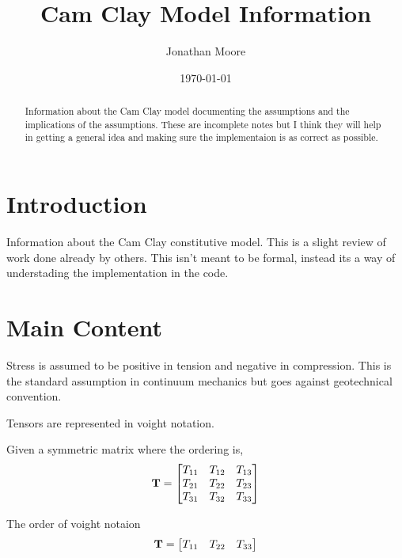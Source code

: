 \documentclass[a4paper,12pt]{article}
\title{Cam Clay Model Information}
\author{Jonathan Moore}
\date{\today}
\begin{document}
\maketitle

\begin{abstract}
    Information about the Cam Clay model documenting the assumptions and the implications of the assumptions. These are incomplete notes but I think they will help in getting a general idea and making sure the implementaion is as correct as possible.
\end{abstract}

\section{Introduction}
Information about the Cam Clay constitutive model. This is a slight review of work done already by others. This isn't meant to be formal, instead its a way of understading the implementation in the code.

\section{Main Content}


Stress is assumed to be positive in tension and negative in compression. This is the standard assumption in continuum mechanics but goes against geotechnical convention.

Tensors are represented in voight notation.


Given a symmetric matrix where the ordering is,
\begin{equation}
    \bf{T} =
    \begin{bmatrix}
        T_{11} & T_{12} & T_{13} \\
        T_{21} & T_{22} & T_{23} \\
        T_{31} & T_{32} & T_{33} \\
    \end{bmatrix}
\end{equation}

The order of voight notaion 
\begin{equation}
    \bf{T} = 
    \begin{bmatrix}
        T_{11} & T_{22} & T_{33} \\
    \end{bmatrix}
\end{equation}

\end{document}
